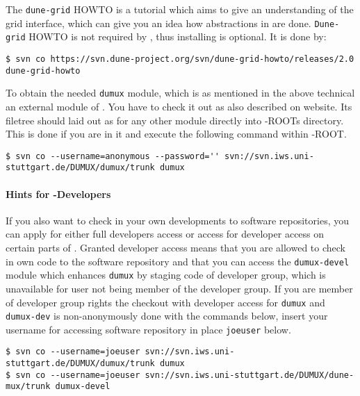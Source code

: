 The \texttt{dune-grid} HOWTO is a tutorial which aims to give an understanding of the \Dune grid interface, which can 
give you an idea how abstractions in \Dune are done. \texttt{Dune-grid} HOWTO is not required by \Dumux, thus installing is optional. It is done by: 

\begin{lstlisting}[style=Bash]
$ svn co https://svn.dune-project.org/svn/dune-grid-howto/releases/2.0 dune-grid-howto
\end{lstlisting}


To obtain the needed \texttt{dumux} module, which is as mentioned in the above technical an external module of \Dune. You have to check it out as also described on \Dumux website. %
Its filetree should laid out as for any other \Dune module directly into \Dune-ROOTs directory. This is done if you are in it and execute the following command within \Dune-ROOT.

\begin{lstlisting}[style=Bash]
$ svn co --username=anonymous --password='' svn://svn.iws.uni-stuttgart.de/DUMUX/dumux/trunk dumux
\end{lstlisting}

\paragraph{Hints for \Dumux-Developers}
If you also want to check in your own \Dumux developments to \Dumux software repositories, you can apply for either full developers access or access for developer access on certain parts of \Dumux. Granted developer access means that you are allowed to check in own code to the software repository and that you can access the \texttt{dumux-devel} module which enhances \texttt{dumux} by staging code of developer group, which is unavailable for user not being member of the developer group.
If you are member of developer group rights the checkout with developer access for \texttt{dumux} and \texttt{dumux-dev} is non-anonymously done with the commands below, insert your username
for accessing \Dumux software repository in place \texttt{joeuser} below.

\begin{lstlisting}[style=Bash]
$ svn co --username=joeuser svn://svn.iws.uni-stuttgart.de/DUMUX/dumux/trunk dumux
$ svn co --username=joeuser svn://svn.iws.uni-stuttgart.de/DUMUX/dune-mux/trunk dumux-devel
\end{lstlisting}


